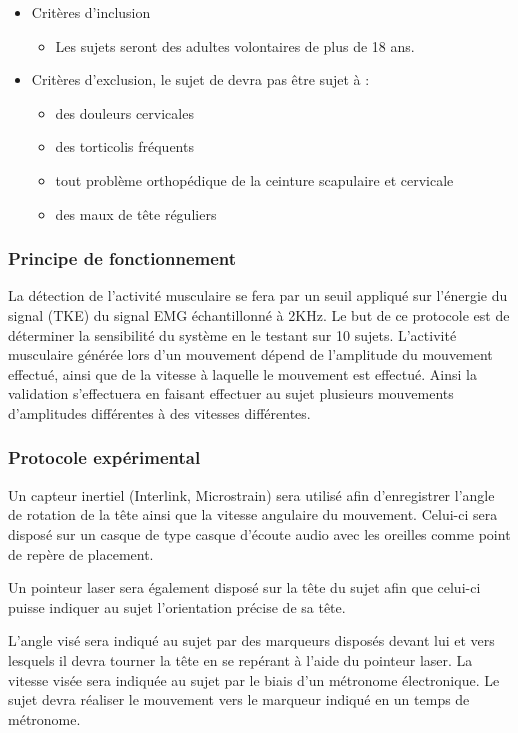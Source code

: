 \documentclass[letterpaper, twoside, 12pt, memoire, creativecommons, hyperref]{thETS}
\begin{document}
\begin{itemize}
 \item Critères d'inclusion
 \begin{itemize}
 	\item Les sujets seront des adultes volontaires de plus de 18 ans.
 \end{itemize}
 \item Critères d'exclusion, le sujet de devra pas être sujet à :
  \begin{itemize}
 	\item des douleurs cervicales
 	\item des torticolis fréquents
 	\item tout problème orthopédique de la ceinture scapulaire et cervicale
 	\item des maux de tête réguliers
 \end{itemize}
\end{itemize}


\subsubsection{Principe de fonctionnement}

La détection de l’activité musculaire se fera par un seuil appliqué sur l’énergie du signal  (TKE) du signal EMG échantillonné à 2KHz. Le but de ce protocole est de déterminer la sensibilité du système en le testant sur 10 sujets. L’activité musculaire générée lors d’un mouvement dépend de l’amplitude du mouvement effectué, ainsi que de la vitesse à laquelle le mouvement est effectué. Ainsi la validation s’effectuera en faisant effectuer au sujet plusieurs mouvements d’amplitudes différentes à des vitesses différentes. 

\subsubsection{Protocole expérimental}

Un capteur inertiel (Interlink, Microstrain) sera utilisé afin d’enregistrer l’angle de rotation de la tête ainsi que la vitesse angulaire du mouvement. Celui-ci sera disposé sur un casque de type casque d’écoute audio avec les oreilles comme point de repère de placement. 

Un pointeur laser sera également disposé sur la tête du sujet afin que celui-ci puisse indiquer au sujet l’orientation précise de sa tête.
 
L’angle visé sera indiqué au sujet par des marqueurs disposés devant lui et vers lesquels il devra tourner la tête en se repérant à l’aide du pointeur laser. La vitesse visée sera indiquée au sujet par le biais d’un métronome électronique. Le sujet devra réaliser le mouvement vers le marqueur indiqué en un temps de métronome. 
\end{document}
